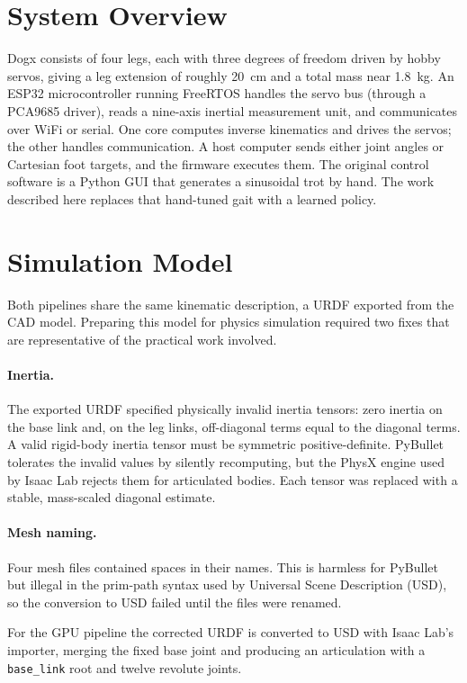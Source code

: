 \documentclass[11pt]{article}
\begin{document}
\section{System Overview}
Dogx consists of four legs, each with three degrees of freedom driven by hobby
servos, giving a leg extension of roughly \SI{20}{\centi\meter} and a total mass
near \SI{1.8}{\kilogram}. An ESP32 microcontroller running FreeRTOS handles the
servo bus (through a PCA9685 driver), reads a nine-axis inertial measurement
unit, and communicates over WiFi or serial. One core computes inverse kinematics
and drives the servos; the other handles communication. A host computer sends
either joint angles or Cartesian foot targets, and the firmware executes them.
The original control software is a Python GUI that generates a sinusoidal trot by
hand. The work described here replaces that hand-tuned gait with a learned policy.

\section{Simulation Model}
Both pipelines share the same kinematic description, a URDF exported from the CAD
model. Preparing this model for physics simulation required two fixes that are
representative of the practical work involved.

\paragraph{Inertia.} The exported URDF specified physically invalid inertia
tensors: zero inertia on the base link and, on the leg links, off-diagonal terms
equal to the diagonal terms. A valid rigid-body inertia tensor must be symmetric
positive-definite. PyBullet tolerates the invalid values by silently
recomputing, but the PhysX engine used by Isaac Lab rejects them for articulated
bodies. Each tensor was replaced with a stable, mass-scaled diagonal estimate.

\paragraph{Mesh naming.} Four mesh files contained spaces in their names. This is
harmless for PyBullet but illegal in the prim-path syntax used by Universal Scene
Description (USD), so the conversion to USD failed until the files were renamed.

For the GPU pipeline the corrected URDF is converted to USD with Isaac Lab's
importer, merging the fixed base joint and producing an articulation with a
\texttt{base\_link} root and twelve revolute joints.
\end{document}
